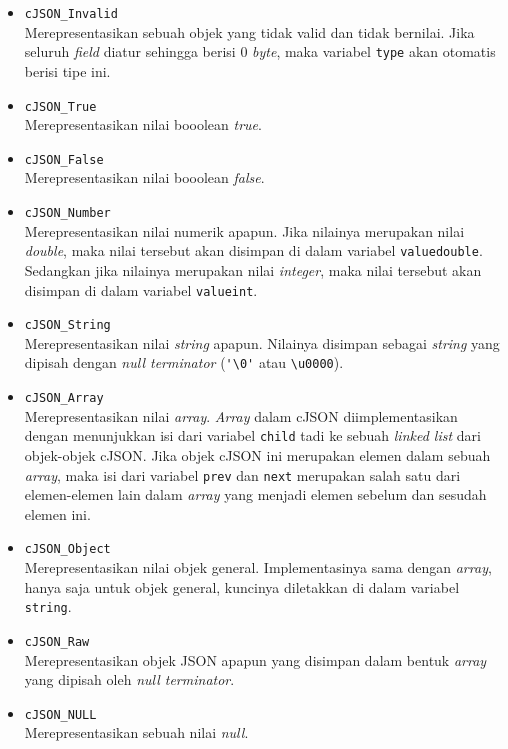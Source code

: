 \documentclass[a4paper,twoside]{article}
\begin{document}
\begin{enumerate}
\begin{itemize}
	\begin{itemize}
		\item \verb|cJSON_Invalid|\\
		Merepresentasikan sebuah objek yang tidak valid dan tidak bernilai. Jika seluruh \textit{field} diatur sehingga berisi 0 \textit{byte}, maka variabel \verb|type| akan otomatis berisi tipe ini.
		\item \verb|cJSON_True|\\
		Merepresentasikan nilai booolean \textit{true}.
		\item \verb|cJSON_False|\\
		Merepresentasikan nilai booolean \textit{false}.
		\item \verb|cJSON_Number|\\
		Merepresentasikan nilai numerik apapun. Jika nilainya merupakan nilai \textit{double}, maka nilai tersebut akan disimpan di dalam variabel \verb|valuedouble|. Sedangkan jika nilainya merupakan nilai \textit{integer}, maka nilai tersebut akan disimpan di dalam variabel \verb|valueint|.
		\item \verb|cJSON_String|\\
		Merepresentasikan nilai \textit{string} apapun. Nilainya disimpan sebagai \textit{string} yang dipisah dengan \textit{null terminator} (\verb|'\0'| atau \verb|\u0000|).
		\item \verb|cJSON_Array|\\
		Merepresentasikan nilai \textit{array}. \textit{Array} dalam cJSON diimplementasikan dengan menunjukkan isi dari variabel \verb|child| tadi ke sebuah \textit{linked list} dari objek-objek cJSON. Jika objek cJSON ini merupakan elemen dalam sebuah \textit{array}, maka isi dari variabel \verb|prev| dan \verb|next| merupakan salah satu dari elemen-elemen lain dalam \textit{array} yang menjadi elemen sebelum dan sesudah elemen ini.
		\item \verb|cJSON_Object|\\
		Merepresentasikan nilai objek general. Implementasinya sama dengan \textit{array}, hanya saja untuk objek general, kuncinya diletakkan di dalam variabel \verb|string|.
		\item \verb|cJSON_Raw|\\
		Merepresentasikan objek JSON apapun yang disimpan dalam bentuk \textit{array} yang dipisah oleh \textit{null terminator}.
		\item \verb|cJSON_NULL|\\
		Merepresentasikan sebuah nilai \textit{null}.
	\end{itemize}
	

\end{itemize}
\end{enumerate}
\end{document}
